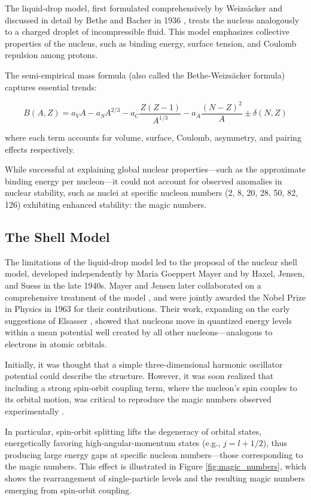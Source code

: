 The liquid-drop model, first formulated comprehensively by Weizsäcker \cite{Weizsacker_1935} and discussed in detail by Bethe and Bacher in 1936 \cite{bethe_nuclear_1936}, treats the nucleus analogously to a charged droplet of incompressible fluid. This model emphasizes collective properties of the nucleus, such as binding energy, surface tension, and Coulomb repulsion among protons.

The semi-empirical mass formula (also called the Bethe-Weizsäcker formula) captures essential trends:

\[B(A,Z) = a_VA - a_SA^{2/3} - a_C\frac{Z(Z-1)}{A^{1/3}} - a_A\frac{(N-Z)^2}{A}\pm \delta(N,Z)\]

where each term accounts for volume, surface, Coulomb, asymmetry, and pairing effects respectively.

While successful at explaining global nuclear properties—such as the approximate binding energy per nucleon—it could not account for observed anomalies in nuclear stability, such as nuclei at specific nucleon numbers (2, 8, 20, 28, 50, 82, 126) exhibiting enhanced stability: the magic numbers.

\subsection{The Shell Model}

The limitations of the liquid-drop model led to the proposal of the nuclear shell model, developed independently by Maria Goeppert Mayer \cite{mayer_1948} and by Haxel, Jensen, and Suess \cite{haxel_magic_nodate} in the late 1940s. Mayer and Jensen later collaborated on a comprehensive treatment of the model \cite{MayerandJensen_1955}, and were jointly awarded the Nobel Prize in Physics in 1963 for their contributions. Their work, expanding on the early suggestions of Elsasser \cite{elsasser_sur_1933}, showed that nucleons move in quantized energy levels within a mean potential well created by all other nucleons—analogous to electrons in atomic orbitals.

Initially, it was thought that a simple three-dimensional harmonic oscillator potential could describe the structure. However, it was soon realized that including a strong spin-orbit coupling term, where the nucleon's spin couples to its orbital motion, was critical to reproduce the magic numbers observed experimentally \cite{mayer_shell_1968}.

In particular, spin-orbit splitting lifts the degeneracy of orbital states, energetically favoring high-angular-momentum states (e.g., $j=l+1/2$), thus producing large energy gaps at specific nucleon numbers—those corresponding to the magic numbers. This effect is illustrated in Figure \ref{fig:magic_numbers}, which shows the rearrangement of single-particle levels and the resulting magic numbers emerging from spin-orbit coupling.

